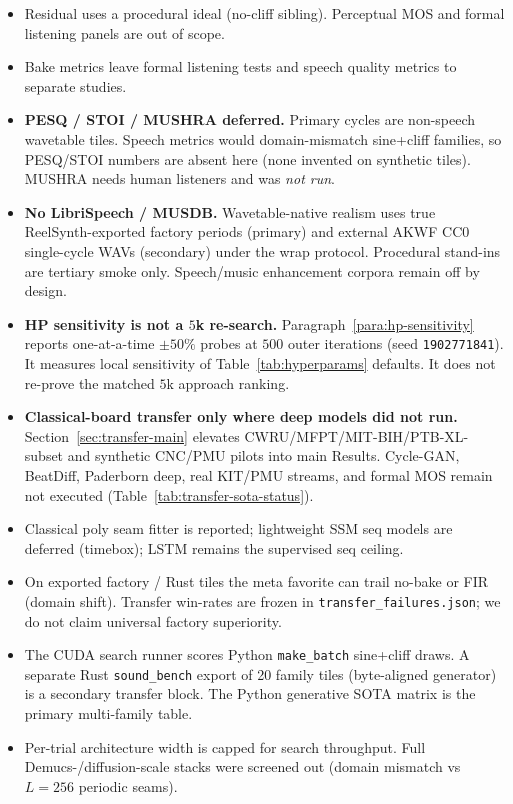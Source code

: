 \begin{itemize}
  \item Residual uses a procedural ideal (no-cliff sibling). Perceptual MOS and formal listening panels are out of scope.
  \item Bake metrics leave formal listening tests and speech quality metrics to separate studies.
  \item \textbf{PESQ / STOI / MUSHRA deferred.} Primary cycles are non-speech wavetable tiles. Speech metrics would domain-mismatch sine{+}cliff families, so PESQ/STOI numbers are absent here (none invented on synthetic tiles). MUSHRA needs human listeners and was \emph{not run}.
  \item \textbf{No LibriSpeech / MUSDB.} Wavetable-native realism uses true ReelSynth-exported factory periods (primary) and external AKWF CC0 single-cycle WAVs (secondary) under the wrap protocol. Procedural stand-ins are tertiary smoke only. Speech/music enhancement corpora remain off by design.
  \item \textbf{HP sensitivity is not a $5$k re-search.} Paragraph~\ref{para:hp-sensitivity} reports one-at-a-time $\pm 50\%$ probes at $500$ outer iterations (seed \texttt{1902771841}). It measures local sensitivity of Table~\ref{tab:hyperparams} defaults. It does not re-prove the matched $5$k approach ranking.
  \item \textbf{Classical-board transfer only where deep models did not run.} Section~\ref{sec:transfer-main} elevates CWRU/MFPT/MIT-BIH/PTB-XL-subset and synthetic CNC/PMU pilots into main Results. Cycle-GAN, BeatDiff, Paderborn deep, real KIT/PMU streams, and formal MOS remain not executed (Table~\ref{tab:transfer-sota-status}).
  \item Classical poly seam fitter is reported; lightweight SSM seq models are deferred (timebox); LSTM remains the supervised seq ceiling.
  \item On exported factory / Rust tiles the meta favorite can trail no-bake or FIR (domain shift). Transfer win-rates are frozen in \texttt{transfer\_failures.json}; we do not claim universal factory superiority.
  \item The CUDA search runner scores Python \texttt{make\_batch} sine{+}cliff draws. A separate Rust \texttt{sound\_bench} export of 20 family tiles (byte-aligned generator) is a secondary transfer block. The Python generative SOTA matrix is the primary multi-family table.
  \item Per-trial architecture width is capped for search throughput. Full Demucs-/diffusion-scale stacks were screened out (domain mismatch vs $L{=}256$ periodic seams).

\end{itemize}
